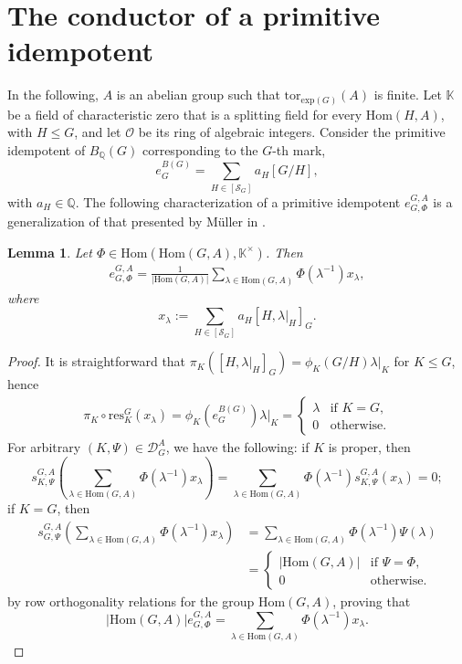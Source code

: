 \documentclass[letterpaper,12pt]{article}
\theoremstyle{plain}
\newtheorem{lemma}[theorem]{Lemma}
\theoremstyle{definition}
\newcommand{\Q}{\mathbb{Q}}
\newcommand{\K}{\mathbb{K}}
\newcommand{\DAG}{\mathcal{D}^A_G}
\newcommand{\SG}{\mathcal{S}_G}
\newcommand{\eGAGPhi}{e^{G,A}_{G,\Phi}}
\begin{document}
\section{The conductor of a primitive idempotent}

In the following, $A$ is an abelian group such that $\mathrm{tor}_{\mathrm{exp}(G)}(A)$ is finite. Let $\K$ be a field of characteristic zero that is a splitting field for every $\mathrm{Hom}(H,A)$, with $H\leq G$, and let $\mathcal{O}$ be its ring of algebraic integers. Consider the primitive idempotent of $B_{\Q}(G)$ corresponding to the $G$-th mark,
$$e^{B(G)}_G=\sum_{H\in [\SG]}a_H[G/H],$$
with $a_H\in \Q$. The following characterization of a primitive idempotent $\eGAGPhi$ is a generalization of that presented by Müller in \cite[\S 3]{Muller}.

\begin{lemma}
    Let $\Phi \in \mathrm{Hom}\left(\mathrm{Hom}(G,A),\K^\times\right)$. Then
    \begin{align}
        \eGAGPhi=\frac{1}{|\mathrm{Hom}(G,A)|}\sum_{\lambda\in \mathrm{Hom}(G,A)}\Phi\left(\lambda^{-1}\right)x_{\lambda},
    \end{align}
    where 
    $$x_{\lambda}:=\sum_{H\in [\SG]}a_H[H,\lambda|_H]_G.$$
\end{lemma}
\begin{proof}
    It is straightforward that $\pi_K\left([H,\lambda|_H]_G\right)=\phi_K(G/H)\lambda|_K$ for $K\leq G$, hence
    \begin{align*}
        \pi_K\circ \mathrm{res}^G_K\left(x_{\lambda}\right)=\phi_K\left(e^{B(G)}_G\right)\lambda|_K=\begin{cases}
            \lambda &\text{if }K=G,\\
            0 &\text{otherwise.}
        \end{cases}
    \end{align*}
    For arbitrary $(K,\Psi)\in \DAG$, we have the following: if $K$ is proper, then
    $$s^{G,A}_{K,\Psi}\left(\sum_{\lambda\in \mathrm{Hom}(G,A)}\Phi\left(\lambda^{-1}\right)x_{\lambda}\right)=\sum_{\lambda\in \mathrm{Hom}(G,A)}\Phi\left(\lambda^{-1}\right)s^{G,A}_{K,\Psi}\left(x_{\lambda}\right)=0;$$
    if $K=G$, then
    \begin{align*}
        s^{G,A}_{G,\Psi}\left(\sum_{\lambda\in \mathrm{Hom}(G,A)}\Phi\left(\lambda^{-1}\right)x_{\lambda}\right) & =\sum_{\lambda\in \mathrm{Hom}(G,A)}\Phi\left(\lambda^{-1}\right)\Psi\left(\lambda\right)\\
        &=\begin{cases}
            |\mathrm{Hom}(G,A)| &\text{if }\Psi=\Phi,\\
            0 &\text{otherwise}.
        \end{cases}
    \end{align*}
    by row orthogonality relations for the group $\mathrm{Hom}(G,A)$, proving that
    \[|\mathrm{Hom}(G,A)|\eGAGPhi=\sum_{\lambda\in \mathrm{Hom}(G,A)}\Phi\left(\lambda^{-1}\right)x_{\lambda}.\]
\end{proof}
\end{document}
